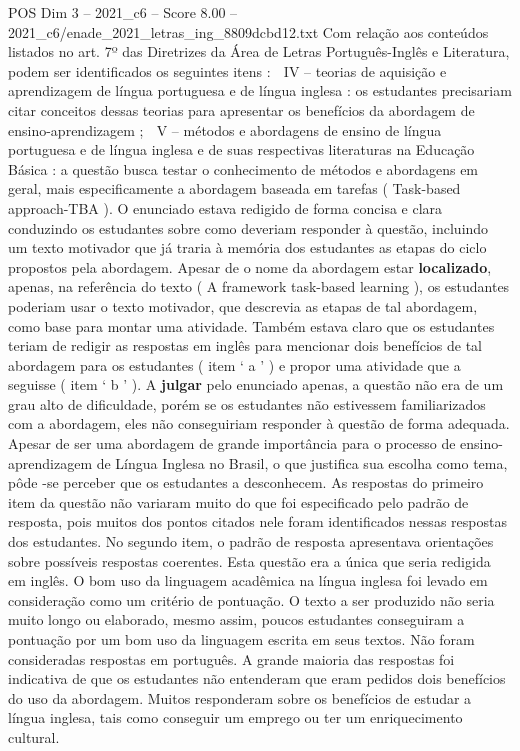 \begin{textsample}{POS Dim 3 – 2021\_c6 – Score 8.00 – 2021\_c6/enade\_2021\_letras\_ing\_8809dcbd12.txt}
Com relação aos conteúdos listados no art. 7º das Diretrizes da Área de Letras Português-Inglês e Literatura, podem ser identificados os seguintes itens :  IV – teorias de aquisição e aprendizagem de língua portuguesa e de língua inglesa : os estudantes precisariam citar conceitos dessas teorias para apresentar os benefícios da abordagem de ensino-aprendizagem ;  V – métodos e abordagens de ensino de língua portuguesa e de língua inglesa e de suas respectivas literaturas na Educação Básica : a questão busca testar o conhecimento de métodos e abordagens em geral, mais especificamente a abordagem baseada em tarefas ( Task-based approach-TBA ).
O enunciado estava redigido de forma concisa e clara conduzindo os estudantes sobre como deveriam responder à questão, incluindo um texto motivador que já traria à memória dos estudantes as etapas do ciclo propostos pela abordagem.
Apesar de o nome da abordagem estar \textbf{localizado}, apenas, na referência do texto ( A framework task-based learning ), os estudantes poderiam usar o texto motivador, que descrevia as etapas de tal abordagem, como base para montar uma atividade.
Também estava claro que os estudantes teriam de redigir as respostas em inglês para mencionar dois benefícios de tal abordagem para os estudantes ( item ‘ a ’ ) e propor uma atividade que a seguisse ( item ‘ b ’ ).
A \textbf{julgar} pelo enunciado apenas, a questão não era de um grau alto de dificuldade, porém se os estudantes não estivessem familiarizados com a abordagem, eles não conseguiriam responder à questão de forma adequada.
Apesar de ser uma abordagem de grande importância para o processo de ensino-aprendizagem de Língua Inglesa no Brasil, o que justifica sua escolha como tema, pôde -se perceber que os estudantes a desconhecem.
As respostas do primeiro item da questão não variaram muito do que foi especificado pelo padrão de resposta, pois muitos dos pontos citados nele foram identificados nessas respostas dos estudantes.
No segundo item, o padrão de resposta apresentava orientações sobre possíveis respostas coerentes.
Esta questão era a única que seria redigida em inglês.
O bom uso da linguagem acadêmica na língua inglesa foi levado em consideração como um critério de pontuação.
O texto a ser produzido não seria muito longo ou elaborado, mesmo assim, poucos estudantes conseguiram a pontuação por um bom uso da linguagem escrita em seus textos.
Não foram consideradas respostas em português.
A grande maioria das respostas foi indicativa de que os estudantes não entenderam que eram pedidos dois benefícios do uso da abordagem.
Muitos responderam sobre os benefícios de estudar a língua inglesa, tais como conseguir um emprego ou ter um enriquecimento cultural.

\end{textsample}
